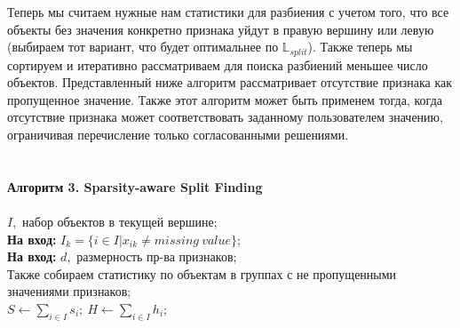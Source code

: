 \documentclass[12pt,fleqn]{article}
\begin{document}
Теперь мы считаем нужные нам статистики для разбиения с учетом того, что все объекты без значения конкретно признака уйдут в правую вершину или левую (выбираем тот вариант, что будет оптимальнее по $\mathbb{L}_{split}$). Также теперь мы сортируем и итеративно рассматриваем для поиска разбиений меньшее число объектов. Представленный ниже алгоритм рассматривает отсутствие признака как пропущенное значение. Также этот алгоритм может быть применем тогда, когда отсутствие признака может соответствовать заданному пользователем значению, ограничивая перечисление только согласованными решениями.\\
\vspace{5pt}
\noindent
\hline\\
\hline\\ \vspace{5pt}
\textbf{Алгоритм 3. Sparsity-aware Split Finding}\\
\hline\\ \vspace{10pt}
 $I$,~набор объектов в текущей вершине;\\
{\bf На вход:} $I_k = \{i \in I| x_{ik} \neq missing~value\}$;\\
{\bf На вход:} $d$,~размерность пр-ва признаков;\\
Также собираем статистику по объектам в группах с не пропущенными значениями признаков;\\
$S \leftarrow \sum_{i \in I}s_i;~H \leftarrow \sum_{i \in I}h_i$;\\ 
\hline\\ \vspace{10pt}
\end{document}
